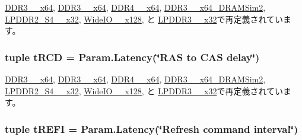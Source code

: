 \hyperlink{classDRAMCtrl_1_1DDR3__1600__x64_a1b5f15dad9d492ce5d0167e1581de8cc}{DDR3\_\_\-x64}, \hyperlink{classDRAMCtrl_1_1DDR3__2133__x64_a1b5f15dad9d492ce5d0167e1581de8cc}{DDR3\_\_\-x64}, \hyperlink{classDRAMCtrl_1_1DDR4__2400__x64_a1b5f15dad9d492ce5d0167e1581de8cc}{DDR4\_\_\-x64}, \hyperlink{classDRAMCtrl_1_1DDR3__1333__x64__DRAMSim2_a1b5f15dad9d492ce5d0167e1581de8cc}{DDR3\_\_\-x64\_\-DRAMSim2}, \hyperlink{classDRAMCtrl_1_1LPDDR2__S4__1066__x32_a1b5f15dad9d492ce5d0167e1581de8cc}{LPDDR2\_\-S4\_\_\-x32}, \hyperlink{classDRAMCtrl_1_1WideIO__200__x128_a1b5f15dad9d492ce5d0167e1581de8cc}{WideIO\_\_\-x128}, と \hyperlink{classDRAMCtrl_1_1LPDDR3__1600__x32_a1b5f15dad9d492ce5d0167e1581de8cc}{LPDDR3\_\_\-x32}で再定義されています。\hypertarget{classDRAMCtrl_1_1DRAMCtrl_ac5b640410cc96d56859a99453a4d4edf}{
\subsubsection[{tRCD}]{\setlength{\rightskip}{0pt plus 5cm}tuple {\bf tRCD} = Param.Latency(\char`\"{}RAS to CAS delay\char`\"{})}}
\label{classDRAMCtrl_1_1DRAMCtrl_ac5b640410cc96d56859a99453a4d4edf}


\hyperlink{classDRAMCtrl_1_1DDR3__1600__x64_a31691ebf1f58ff89b00f261f5adea8e2}{DDR3\_\_\-x64}, \hyperlink{classDRAMCtrl_1_1DDR3__2133__x64_a31691ebf1f58ff89b00f261f5adea8e2}{DDR3\_\_\-x64}, \hyperlink{classDRAMCtrl_1_1DDR4__2400__x64_a31691ebf1f58ff89b00f261f5adea8e2}{DDR4\_\_\-x64}, \hyperlink{classDRAMCtrl_1_1DDR3__1333__x64__DRAMSim2_a31691ebf1f58ff89b00f261f5adea8e2}{DDR3\_\_\-x64\_\-DRAMSim2}, \hyperlink{classDRAMCtrl_1_1LPDDR2__S4__1066__x32_a31691ebf1f58ff89b00f261f5adea8e2}{LPDDR2\_\-S4\_\_\-x32}, \hyperlink{classDRAMCtrl_1_1WideIO__200__x128_a31691ebf1f58ff89b00f261f5adea8e2}{WideIO\_\_\-x128}, と \hyperlink{classDRAMCtrl_1_1LPDDR3__1600__x32_a31691ebf1f58ff89b00f261f5adea8e2}{LPDDR3\_\_\-x32}で再定義されています。\hypertarget{classDRAMCtrl_1_1DRAMCtrl_abe6e6760f393c9748af2550b3f80fef8}{
\subsubsection[{tREFI}]{\setlength{\rightskip}{0pt plus 5cm}tuple {\bf tREFI} = Param.Latency(\char`\"{}Refresh command interval\char`\"{})}}
\label{classDRAMCtrl_1_1DRAMCtrl_abe6e6760f393c9748af2550b3f80fef8}


